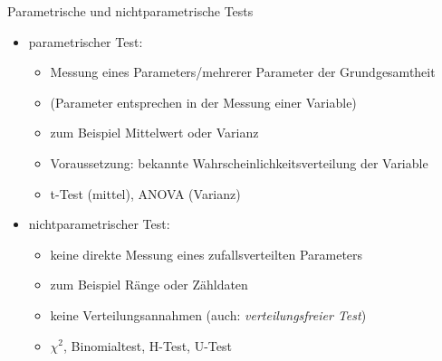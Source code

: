 \begin{frame}
  {Parametrische und nichtparametrische Tests}
  \begin{itemize}
    \item \alert{parametrischer Test}:
      \begin{itemize}
        \item Messung eines Parameters\slash mehrerer Parameter der Grundgesamtheit
        \item (Parameter entsprechen in der Messung einer Variable)
        \item zum Beispiel Mittelwert oder Varianz
        \item Voraussetzung: \alert{bekannte Wahrscheinlichkeitsverteilung der Variable}
        \item \zB t-Test (mittel), ANOVA (Varianz)
      \end{itemize}
    \vspace{\baselineskip}
    \item \alert{nichtparametrischer Test}:
      \begin{itemize}
        \item keine direkte Messung eines zufallsverteilten Parameters
        \item zum Beispiel Ränge oder Zähldaten
        \item keine Verteilungsannahmen (auch: \textit{verteilungsfreier Test})
        \item \zB $\chi^2$, Binomialtest, H-Test, U-Test
      \end{itemize}
  \end{itemize}
\end{frame}


